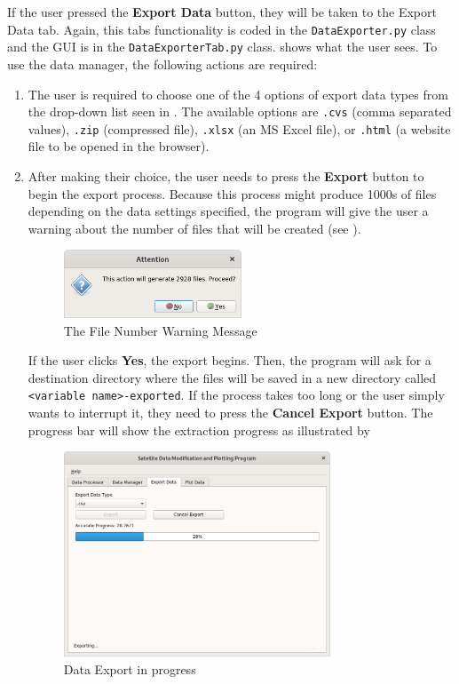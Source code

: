 \documentclass[../00_main.tex]{subfiles}
\begin{document}
If the user pressed the \textbf{Export Data} button, they will be taken to the
Export Data tab. Again, this tabs functionality is coded in the
\texttt{DataExporter.py} class and the GUI is in the
\texttt{DataExporterTab.py} class.  shows what the user sees. To
use the data manager, the following actions are required:
\begin{enumerate}
    \item The user is required to choose one of the 4 options of export data
        types from the drop-down list seen in . The available
        options are \texttt{.cvs} (comma separated values), \texttt{.zip}
        (compressed file), \texttt{.xlsx} (an MS Excel file), or \texttt{.html}
        (a website file to be opened in the browser). 
    \item After making their choice, the user needs to press the
        \textbf{Export} button to begin the export process. Because this
        process might produce 1000s of files depending on the data settings
        specified, the program will give the user a warning about the number of
        files that will be created (see ). 
        \begin{figure}[H]
            \center
            \includegraphics[width=0.5\textwidth]{../graphics/de02}
            \caption{The File Number Warning Message}
            \label{de02}
        \end{figure}
        If the user clicks \textbf{Yes}, the
        export begins. Then, the program will ask for a destination directory 
        where the files
        will be saved in a new directory called \texttt{<variable
        name>-exported}. If the process
        takes too long or the user simply wants to interrupt it, they need to
        press the \textbf{Cancel Export} button. The progress bar will show the
        extraction progress as illustrated by 
        \begin{figure}[H]
            \center
            \includegraphics[width=0.75\textwidth]{../graphics/de03}
            \caption{Data Export in progress}
            \label{de03}
        \end{figure}
\end{enumerate}
\end{document}
